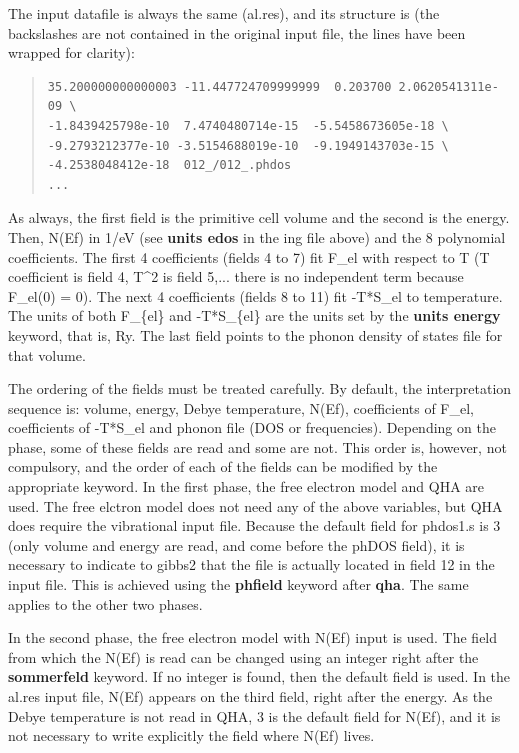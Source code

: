 \documentclass[a4paper]{article}
\begin{document}
The input datafile is always the same (al.res), and its structure is
(the backslashes are not contained in the original input file, the
lines have been wrapped for clarity):

\begin{quote}
\begin{verbatim}
35.200000000000003 -11.447724709999999  0.203700 2.0620541311e-09 \
-1.8439425798e-10  7.4740480714e-15  -5.5458673605e-18 \
-9.2793212377e-10 -3.5154688019e-10  -9.1949143703e-15 \
-4.2538048412e-18  012_/012_.phdos
...
\end{verbatim}
\end{quote}

As always, the first field is the primitive cell volume and the second
is the energy. Then, N(Ef) in 1/eV (see \textbf{units edos} in the ing
file above) and the 8 polynomial coefficients. The first 4
coefficients (fields 4 to 7) fit F\_el with respect to T (T coefficient
is field 4, T\textasciicircum{}2 is field 5,... there is no independent term because
F\_el(0) = 0). The next 4 coefficients (fields 8 to 11) fit -T*S\_el to
temperature. The units of both F\_\{el\} and -T*S\_\{el\} are the units set
by the \textbf{units energy} keyword, that is, Ry. The last field points to
the phonon density of states file for that volume.

The ordering of the fields must be treated carefully. By default, the
interpretation sequence is: volume, energy, Debye temperature, N(Ef),
coefficients of F\_el, coefficients of -T*S\_el and phonon file (DOS or
frequencies). Depending on the phase, some of these fields are read
and some are not. This order is, however, not compulsory, and the
order of each of the fields can be modified by the appropriate
keyword. In the first phase, the free electron model and QHA are
used. The free elctron model does not need any of the above variables,
but QHA does require the vibrational input file. Because the default
field for phdos1.s is 3 (only volume and energy are read, and come
before the phDOS field), it is necessary to indicate to gibbs2 that
the file is actually located in field 12 in the input file. This is
achieved using the \textbf{phfield} keyword after \textbf{qha}. The same applies
to the other two phases.

In the second phase, the free electron model with N(Ef) input is
used. The field from which the N(Ef) is read can be changed using an
integer right after the \textbf{sommerfeld} keyword. If no integer is
found, then the default field is used. In the al.res input file, N(Ef)
appears on the third field, right after the energy. As the Debye
temperature is not read in QHA, 3 is the default field for N(Ef), and
it is not necessary to write explicitly the field where N(Ef) lives.
\end{document}
